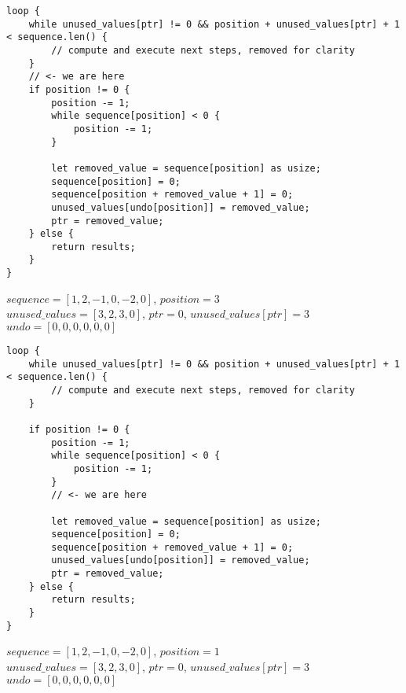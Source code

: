 \begin{frame}[fragile]
    \begin{verbatim}
loop {
    while unused_values[ptr] != 0 && position + unused_values[ptr] + 1 < sequence.len() {
        // compute and execute next steps, removed for clarity
    }
    // <- we are here
    if position != 0 {
        position -= 1;
        while sequence[position] < 0 {
            position -= 1;
        }

        let removed_value = sequence[position] as usize;
        sequence[position] = 0;
        sequence[position + removed_value + 1] = 0;
        unused_values[undo[position]] = removed_value;
        ptr = removed_value;
    } else {
        return results;
    }
}
    \end{verbatim}
    $sequence = [1, 2, -1, 0, -2, 0]$, $position = 3$\\
    $unused\_values = [3, 2, 3, 0]$, $ptr = 0$, $unused\_values[ptr] = 3$\\
    $undo = [0, 0, 0, 0, 0, 0]$
\end{frame}
\begin{frame}[fragile]
    \begin{verbatim}
loop {
    while unused_values[ptr] != 0 && position + unused_values[ptr] + 1 < sequence.len() {
        // compute and execute next steps, removed for clarity
    }
    
    if position != 0 {
        position -= 1;
        while sequence[position] < 0 {
            position -= 1;
        }
        // <- we are here

        let removed_value = sequence[position] as usize;
        sequence[position] = 0;
        sequence[position + removed_value + 1] = 0;
        unused_values[undo[position]] = removed_value;
        ptr = removed_value;
    } else {
        return results;
    }
}
    \end{verbatim}
    $sequence = [1, 2, -1, 0, -2, 0]$, $position = 1$\\
    $unused\_values = [3, 2, 3, 0]$, $ptr = 0$, $unused\_values[ptr] = 3$\\
    $undo = [0, 0, 0, 0, 0, 0]$
\end{frame}
